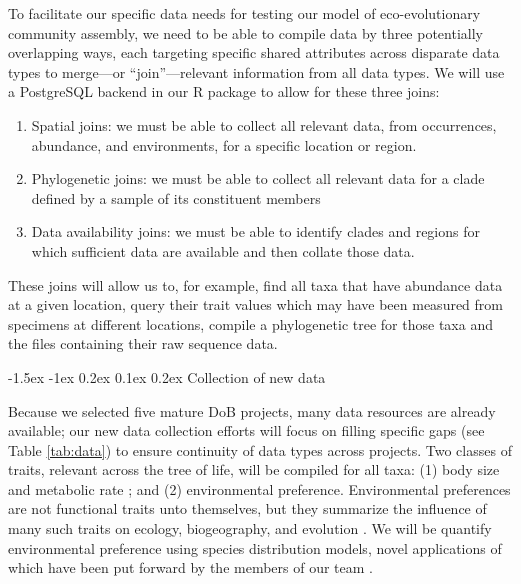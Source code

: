 \documentclass[11pt]{article}
\makeatletter
\renewcommand\subsubsection{\@startsection{subsection}{1}{\z@}%
                                  {-1.5ex \@plus -1ex \@minus 0.2ex}%
                                  {0.1ex \@plus 0.2ex}%
                                  {\normalfont\bfseries}}
\makeatother
\begin{document}
To facilitate our specific data needs for testing our model of
eco-evolutionary community assembly, we need to be able to compile data
by three potentially overlapping ways, each targeting specific shared
attributes across disparate data types to merge---or ``join''---relevant
information from all data types. We will use a PostgreSQL
\cite{Douglas2003-zs} backend in our R package to allow for these three
joins:

\begin{enumerate}
\def\labelenumi{\arabic{enumi}.}
\item
  Spatial joins: we must be able to collect all relevant data, from
  occurrences, abundance, and environments, for a specific location or
  region.
\item
  Phylogenetic joins: we must be able to collect all relevant data for a
  clade defined by a sample of its constituent members
\item
  Data availability joins: we must be able to identify clades and
  regions for which sufficient data are available and then collate those
  data.
\end{enumerate}

These joins will allow us to, for example, find all taxa that have
abundance data at a given location, query their trait values which may
have been measured from specimens at different locations, compile a
phylogenetic tree for those taxa and the files containing their raw
sequence data.

\subsubsection{Collection of new data} \label{collection-of-new-data}

Because we selected five mature DoB projects, many data resources are
already available; our new data collection efforts will focus on
filling specific gaps (see Table \ref{tab:data}) to ensure continuity
of data types across projects. Two classes of traits, relevant across
the tree of life, will be compiled for all taxa: (1) body size and
metabolic rate \cite{brown2004, price2012}; and (2) environmental
preference. Environmental preferences are not functional traits unto
themselves, but they summarize the influence of many such traits on
ecology, biogeography, and evolution \cite{elith2009}. We will be
quantify environmental preference using species distribution models,
novel applications of which have been put forward by the members of
our team \citep[e.g.;][]{Owens2017-ja, Carnaval2014-je,
  Carnaval2008-og}.
\end{document}
